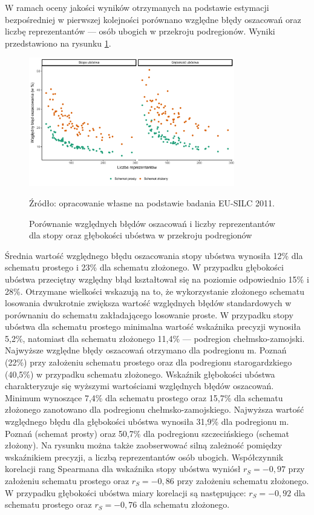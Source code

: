 W ramach oceny jakości wyników otrzymanych na podstawie estymacji bezpośredniej w pierwszej kolejności porównano względne błędy oszacowań oraz liczbę reprezentantów --- osób ubogich w przekroju podregionów. Wyniki przedstawiono na rysunku \ref{fig:prec_ht_podreg}.

\begin{figure}[htp]
\centering
\includegraphics[width=0.8\textwidth]{04_wykresy/precyzja_ht_podreg-1.pdf}
\caption{Porównanie względnych błędów oszacowań i liczby reprezentantów dla stopy oraz głębokości ubóstwa w przekroju podregionów}
\small{Źródło: opracowanie własne na podstawie badania EU-SILC 2011.}
\label{fig:prec_ht_podreg}
\end{figure}

Średnia wartość względnego błędu oszacowania stopy ubóstwa wynosiła 12\% dla schematu prostego i 23\% dla schematu złożonego. W przypadku głębokości ubóstwa przeciętny względny błąd kształtował się na poziomie odpowiednio 15\% i 28\%. Otrzymane wielkości wskazują na to, że wykorzystanie złożonego schematu losowania dwukrotnie zwiększa wartość względnych błędów standardowych w porównaniu do schematu zakładającego losowanie proste. W przypadku stopy ubóstwa dla schematu prostego minimalna wartość wskaźnika precyzji wynosiła 5,2\%, natomiast dla schematu złożonego 11,4\% --- podregion chełmsko-zamojski. Najwyższe względne błędy oszacowań otrzymano dla podregionu m. Poznań (22\%) przy założeniu schematu prostego oraz dla podregionu starogardzkiego (40,5\%) w przypadku schematu złożonego. Wskaźnik głębokości ubóstwa charakteryzuje się wyższymi wartościami względnych błędów oszacowań. Minimum wynoszące 7,4\% dla schematu prostego oraz 15,7\% dla schematu złożonego zanotowano dla podregionu chełmsko-zamojskiego. Najwyższa wartość względnego błędu dla głębokości ubóstwa wynosiła 31,9\% dla podregionu m. Poznań (schemat prosty) oraz 50,7\% dla podregionu szczecińskiego (schemat złożony). Na rysunku można także zaobserwować silną zależność pomiędzy wskaźnikiem precyzji, a liczbą reprezentantów osób ubogich. Współczynnik korelacji rang Spearmana dla wskaźnika stopy ubóstwa wyniósł $r_S=-0,97$ przy założeniu schematu prostego oraz $r_S=-0,86$ przy założeniu schematu złożonego. W przypadku głębokości ubóstwa miary korelacji są następujące: $r_S=-0,92$ dla schematu prostego oraz $r_S=-0,76$ dla schematu złożonego.


